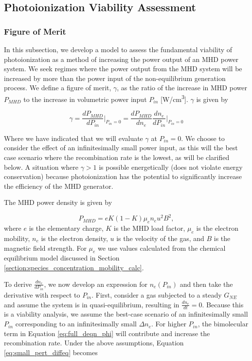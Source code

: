 \subsection{Photoionization Viability Assessment}

\subsubsection{Figure of Merit}

In this subsection, we develop a model to assess the fundamental viability of photoionization as a method of increasing the power output of an MHD power system. We seek regimes where the power output from the MHD system will be increased by more than the power input of the non-equilibrium generation process. We define a figure of merit, $\gamma$, as the ratio of the increase in MHD power $P_{MHD}$ to the increase in volumetric power input $P_{in}$ [\unit{\watt/\centi\meter^3}]. $\gamma$ is given by

\begin{equation}
  \label{eq:beta_def}
\gamma = \frac{dP_{MHD}}{dP_{in}} \Big|_{P_{in}=0} = \frac{dP_{MHD}}{dn_{e}}\frac{dn_{e}}{dP_{in}}\Big|_{P_{in}=0}
\end{equation}

Where we have indicated that we will evaluate $\gamma$ at $P_{in} = 0$. We choose to consider the effect of an infinitesimally small power input, as this will the best case scenario where the recombination rate is the lowest, as will be clarified below. A situation where $\gamma > 1$ is possible energetically (does not violate energy conservation) because photoionization has the potential to significantly increase the efficiency of the MHD generator. 

The MHD power density is given by

\begin{equation}
  \label{eq:mhd_power}
P_{MHD} = e K(1-K) \mu_e n_e u^2 B^2,
\end{equation}
where $e$ is the elementary charge, $K$ is the MHD load factor,  $\mu_e$ is the electron mobility, $n_e$ is the electron density, $u$ is the velocity of the gas, and $B$ is the magnetic field strength. For $\mu_e$ we use values calculated from the chemical equilibrium model discussed in Section \ref{section:species_concentration_mobility_calc}.

To derive $\frac{dn_{e}}{dP_{in}}$, we now develop an expression for $n_e(P_{in})$ and then take the derivative with respect to $P_{in}$. First, consider a gas subjected to a steady $G_{NE}$ and assume the system is in quasi-equilibrium, resulting in $\frac{dn_{e}}{dt} = 0$. Because this is a viability analysis, we assume the best-case scenario of an infinitesimally small $P_{in}$ corresponding to an infinitesimally small $\Delta n_{e}$. For higher $P_{in}$, the bimolecular term in Equation \ref{eq:full_deqn_phi} will contribute and increase the recombination rate. Under the above assumptions, Equation \ref{eq:small_pert_diffeq} becomes

